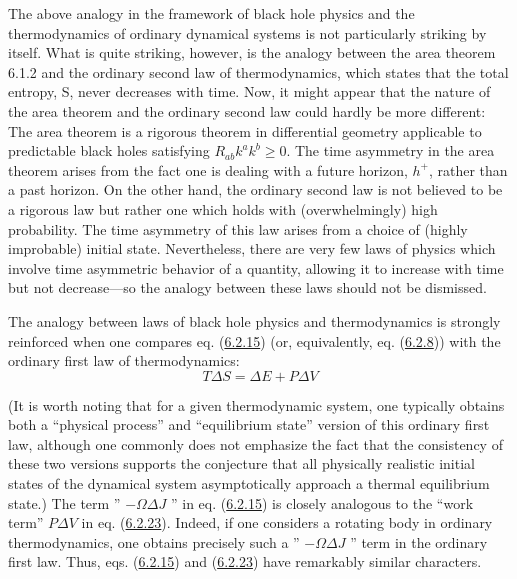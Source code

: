 \documentclass[11pt,a4paper]{article}
\begin{document}
The above analogy in the framework of black hole physics and the thermodynamics of ordinary dynamical systems is not particularly striking by itself. What is quite striking, however, is the analogy between the area theorem 6.1.2 and the ordinary second law of thermodynamics, which states that the total entropy, S, never decreases with time. Now, it might appear that the nature of the area theorem and the ordinary second law could hardly be more different: The area theorem is a rigorous theorem in differential geometry applicable to predictable black holes satisfying \(R_{ab}k^ak^b\geq0\). The time asymmetry in the area theorem arises from the fact one is dealing with a future horizon, \(h^+\), rather than a past horizon. On the other hand, the ordinary second law is not believed to be a rigorous law but rather one which holds with (overwhelmingly) high probability. The time asymmetry of this law arises from a choice of (highly improbable) initial state. Nevertheless, there are very few laws of physics which involve time asymmetric behavior of a quantity, allowing it to increase with time but not decrease---so the analogy between these laws should not be dismissed.

The analogy between laws of black hole physics and thermodynamics is strongly reinforced when one compares eq. (\hyperref[eq:6.2.15]{6.2.15}) (or, equivalently, eq. (\hyperref[eq:6.2.8]{6.2.8})) with the ordinary first law of thermodynamics:
\begin{equation*}
T\Delta S = \Delta E + P\Delta V \tag{6.2.23}\label{eq:6.2.23}
\end{equation*}

(It is worth noting that for a given thermodynamic system, one typically obtains both a ``physical process'' and ``equilibrium state'' version of this ordinary first law, although one commonly does not emphasize the fact that the consistency of these two versions supports the conjecture that all physically realistic initial states of the dynamical system asymptotically approach a thermal equilibrium state.) The term '' \(-\Omega\Delta J\) '' in eq. (\hyperref[eq:6.2.15]{6.2.15}) is closely analogous to the ``work term'' \(P\Delta V\) in eq. (\hyperref[eq:6.2.23]{6.2.23}). Indeed, if one considers a rotating body in ordinary thermodynamics, one obtains precisely such a '' \(-\Omega\Delta J\) '' term in the ordinary first law. Thus, eqs. (\hyperref[eq:6.2.15]{6.2.15}) and (\hyperref[eq:6.2.23]{6.2.23}) \hypertarget{source-162}{} have remarkably similar characters.
\end{document}
